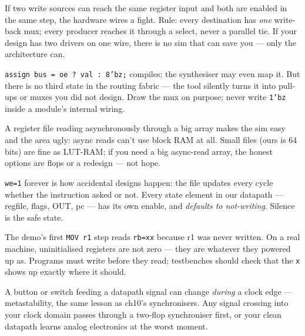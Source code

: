 \begin{tripwire}
If two write sources can reach the same register input and both are
enabled in the same step, the hardware wires a fight. Rule: every
destination has \emph{one} write-back mux; every producer reaches it
through a select, never a parallel tie. If your design has two
drivers on one wire, there is no sim that can save you --- only the
architecture can.
\end{tripwire}
\begin{tripwire}
\texttt{assign bus = oe ? val : 8'bz;} compiles; the synthesiser may
even map it. But there is no third state in the routing fabric ---
the tool silently turns it into pull-ups or muxes you did not design.
Draw the mux on purpose; never write \texttt{1'bz} inside a module's
internal wiring.
\end{tripwire}
\begin{tripwire}
A register file reading asynchronously through a big array makes the
sim easy and the area ugly: async reads can't use block RAM at all.
Small files (ours is 64 bits) are fine as LUT-RAM; if you need a big
async-read array, the honest options are flops or a redesign --- not
hope.
\end{tripwire}
\begin{tripwire}
\texttt{we=1} forever is how accidental designs happen: the file
updates every cycle whether the instruction asked or not. Every
state element in our datapath --- regfile, flags, OUT, pc --- has its
own enable, and \emph{defaults to not-writing}. Silence is the safe
state.
\end{tripwire}
\begin{tripwire}
The demo's first \texttt{MOV r1} step reads \texttt{rb=xx} because r1
was never written. On a real machine, uninitialised registers are not
zero --- they are whatever they powered up as. Programs must write
before they read; testbenches should check that the \texttt{x} shows
up exactly where it should.
\end{tripwire}
\begin{tripwire}
A button or switch feeding a datapath signal can change \emph{during}
a clock edge --- metastability, the same lesson as ch10's
synchronisers. Any signal crossing into your clock domain passes
through a two-flop synchroniser first, or your clean datapath learns
analog electronics at the worst moment.
\end{tripwire}

